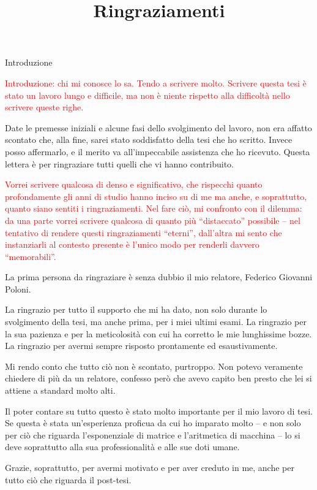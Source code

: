\documentclass[a4paper,11pt]{article}
\begin{document}
	\title{Ringraziamenti}
	\maketitle
	
	Introduzione 
	
	\textcolor{red}{Introduzione: chi mi conosce lo sa. Tendo a scrivere molto. Scrivere questa tesi è stato un lavoro lungo e difficile, ma non è niente rispetto alla difficoltà nello scrivere queste righe.}
	
	{\color{red} Date le premesse iniziali e alcune fasi dello svolgimento del lavoro, non era affatto scontato che, alla fine, sarei stato soddisfatto della tesi che ho scritto. 
	Invece posso affermarlo, e il merito va all'impeccabile assistenza che ho ricevuto. Questa lettera è per ringraziare tutti quelli che vi hanno contribuito.}
	
	\textcolor{red}{Vorrei scrivere qualcosa di denso e significativo, che rispecchi quanto profondamente gli anni di studio hanno inciso su di me ma anche, e soprattutto, quanto siano sentiti i ringraziamenti. Nel fare ciò, mi confronto con il dilemma: da una parte vorrei scrivere qualcosa di quanto più ``distaccato'' possibile -- nel tentativo di rendere questi ringraziamenti ``eterni'', dall'altra mi sento che instanziarli al contesto presente è l'unico modo per renderli davvero ``memorabili''.}
	\bigskip  
	
	La prima persona da ringraziare è senza dubbio il mio relatore, Federico Giovanni Poloni. 
	
	La ringrazio per tutto il supporto che mi ha dato, non solo durante lo svolgimento della tesi, ma anche prima, per i miei ultimi esami. La ringrazio per la sua pazienza e per la meticolosità con cui ha corretto le mie lunghissime bozze. La ringrazio per avermi sempre risposto prontamente ed esaustivamente.
	
	Mi rendo conto che tutto ciò non è scontato, purtroppo. Non potevo veramente chiedere di più da un relatore, confesso però che avevo capito ben presto che lei si attiene a standard molto alti. 
	
	Il poter contare su tutto questo è stato molto importante per il mio lavoro di tesi. Se questa è stata un'esperienza proficua da cui ho imparato molto -- e non solo per ciò che riguarda l'esponenziale di matrice e l'aritmetica di macchina -- lo si deve soprattutto alla sua professionalità e alle sue doti umane. 
	
	Grazie, soprattutto, per avermi motivato e per aver creduto in me, anche per tutto ciò che riguarda il post-tesi.
	\medskip  
	
\end{document}
